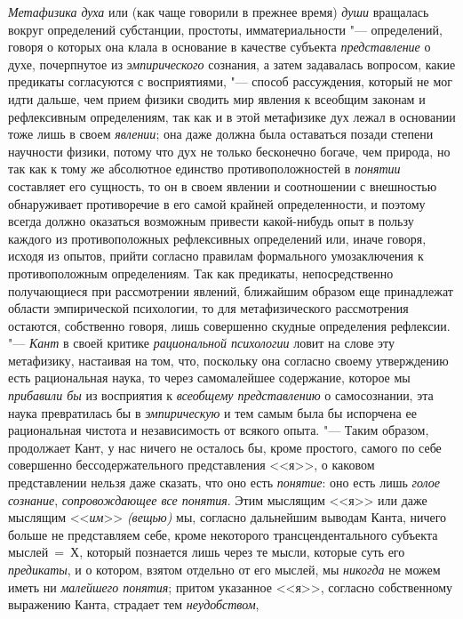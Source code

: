 {{{\em Метафизика духа} или
(как чаще говорили в прежнее время)
{\em души} вращалась
вокруг определений субстанции, простоты, имматериальности
"--- определений, говоря о которых она клала в основание в
качестве субъекта {\em представление}
о духе, почерпнутое из
{\em эмпирического}
сознания, а затем задавалась вопросом, какие предикаты
согласуются с восприятиями, "--- способ рассуждения, который не
мог идти дальше, чем прием физики сводить мир явления к всеобщим законам и
рефлексивным определениям, так как и в этой метафизике дух лежал в
основании тоже лишь в своем
{\em явлении}; она даже
должна была оставаться позади степени научности физики,
потому что дух не только бесконечно богаче, чем природа, но
так как к тому же абсолютное единство противоположностей в
{\em понятии} составляет
его сущность, то он в своем явлении и соотношении с внешностью обнаруживает
противоречие в его самой крайней определенности, и поэтому всегда должно
оказаться возможным привести какой-нибудь опыт в пользу каждого из
противоположных рефлексивных определений или, иначе говоря, исходя из
опытов, прийти согласно правилам формального умозаключения к
противоположным определениям. Так как предикаты, непосредственно
получающиеся при рассмотрении явлений, ближайшим образом еще принадлежат
области эмпирической психологии, то для метафизического рассмотрения
остаются, собственно говоря, лишь совершенно скудные определения
рефлексии. "--- {\em Кант} в
своей критике {\em рациональной
психологии} ловит на слове эту метафизику, настаивая на том,
что, поскольку она согласно своему утверждению есть рациональная наука, то
через самомалейшее содержание, которое мы
{\em прибавили бы} из
восприятия к {\em всеобщему
представлению} о самосознании, эта наука превратилась бы в
{\em эмпирическую} и тем
самым была бы испорчена ее рациональная чистота и независимость от всякого
опыта. "--- Таким образом, продолжает Кант, у нас ничего не
осталось бы, кроме простого, самого по себе совершенно бессодержательного
представления <<я>>, о каковом представлении нельзя даже сказать, что оно
есть {\em понятие}: оно
есть лишь {\em голое сознание},
{\em сопровождающее все понятия}.
Этим мыслящим <<я>> или даже мыслящим
<<{\em им}>>
{\em (вещью)} мы, согласно
дальнейшим выводам Канта, ничего больше не представляем себе, кроме
некоторого трансцендентального субъекта мыслей~=~Х, который познается лишь
через те мысли, которые суть его
{\em предикаты}, и о
котором, взятом отдельно от его мыслей, мы
{\em никогда} не можем
иметь ни {\em малейшего понятия};
притом указанное <<я>>, согласно собственному выражению Канта,
страдает тем {\em неудобством},
}}
